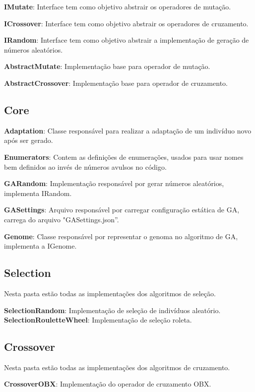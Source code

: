 \textbf{IMutate}: Interface tem como objetivo abstrair os operadores de mutação.
 
 \textbf{ICrossover}:  Interface tem como objetivo abstrair os operadores de cruzamento.
 
 \textbf{IRandom}: Interface tem como objetivo abstrair a implementação de geração de números aleatórios.
 
 \textbf{AbstractMutate}: Implementação base para operador de mutação.
 
 \textbf{AbstractCrossover}: Implementação base para operador de cruzamento.
 
 \subsection{Core}
 
 \textbf{Adaptation}: Classe responsável para realizar a adaptação de um indivíduo novo após ser gerado.
 
 \textbf{Enumerators}: Contem as definições de enumerações, usados para usar nomes bem definidos ao invés de números avulsos no código.
 
 \textbf{GARandom}: Implementação responsável por gerar números aleatórios, implementa IRandom.
 
 \textbf{GASettings}: Arquivo responsável por carregar configuração estática de GA, carrega do arquivo "GASettings.json”.
 
 \textbf{Genome}: Classe responsável por representar o genoma no algoritmo de GA, implementa a IGenome.
 
 
 \subsection{Selection}
 
 Nesta pasta estão todas as implementações dos algoritmos de seleção.
 
 \textbf{SelectionRandom}: Implementação de seleção de indivíduos aleatório.
 \textbf{SelectionRouletteWheel}: Implementação de seleção roleta.
 
 \subsection{Crossover}
 
 Nesta pasta estão todas as implementações dos algoritmos de cruzamento.
 
 \textbf{CrossoverOBX}: Implementação do operador de cruzamento OBX.
 
